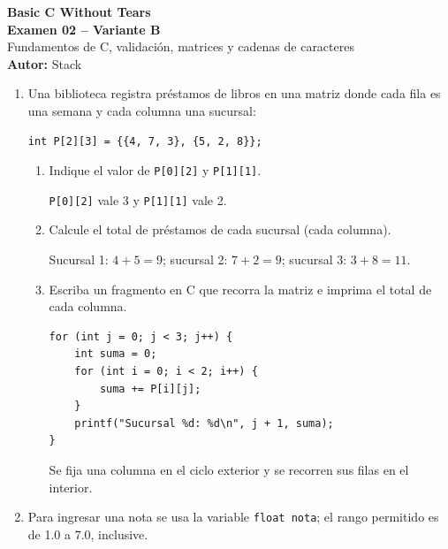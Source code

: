 
\newcommand{\NombreDocumento}{Examen 02 -- Variante B}

\begin{center}
    {\LARGE \textbf{Basic C Without Tears}} \\[0.2cm]
    {\Large \textbf{Examen 02 -- Variante B}} \\[0.12cm]
    \small Fundamentos de C, validación, matrices y cadenas de caracteres \\[0.08cm]
    \textbf{Autor:} Stack
\end{center}
\vspace{0.2cm}
\begin{enumerate}[label=\textbf{\arabic*.}]
\item Una biblioteca registra préstamos de libros en una matriz donde cada fila es una semana y cada columna una sucursal:
\begin{lstlisting}[style=customc, numbers=none]
int P[2][3] = {{4, 7, 3}, {5, 2, 8}};
\end{lstlisting}
\begin{enumerate}[label=(\alph*)]
\item Indique el valor de \texttt{P[0][2]} y \texttt{P[1][1]}.
\ifpauta\begin{solucionbox}\texttt{P[0][2]} vale 3 y \texttt{P[1][1]} vale 2.\end{solucionbox}\else\vspace{1.5cm}\fi
\item Calcule el total de préstamos de cada sucursal (cada columna).
\ifpauta\begin{solucionbox}Sucursal 1: $4+5=9$; sucursal 2: $7+2=9$; sucursal 3: $3+8=11$.\end{solucionbox}\else\vspace{2cm}\fi
\item Escriba un fragmento en C que recorra la matriz e imprima el total de cada columna.
\ifpauta\begin{solucionbox}\begin{lstlisting}[style=customc]
for (int j = 0; j < 3; j++) {
    int suma = 0;
    for (int i = 0; i < 2; i++) {
        suma += P[i][j];
    }
    printf("Sucursal %d: %d\n", j + 1, suma);
}
\end{lstlisting}Se fija una columna en el ciclo exterior y se recorren sus filas en el interior.\end{solucionbox}\else\vspace{3cm}\fi
\end{enumerate}
\newpage
\item Para ingresar una nota se usa la variable \texttt{float nota}; el rango permitido es de 1.0 a 7.0, inclusive.

\end{enumerate}
